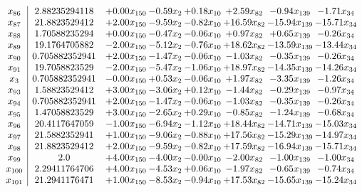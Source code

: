 \documentclass[8pt]{article}
\begin{document}
\[\begin{array}{c| c c@{\hskip 2pt} c@{\hskip 2pt} c@{\hskip 2pt} c@{\hskip 2pt} c@{\hskip 2pt} c@{\hskip 2pt} }
 x_{86}   &  2.88235294118 & +  0.00 x_{150} & -0.59 x_{2} & +  0.18 x_{10} & +  2.59 x_{82} & -0.94 x_{139} & -1.71 x_{34}\\
 x_{87}   &  21.8823529412 & +  2.00 x_{150} & -9.59 x_{2} & -0.82 x_{10} & + 16.59 x_{82} & -15.94 x_{139} & -15.71 x_{34}\\
 x_{88}   &  1.70588235294 & +  0.00 x_{150} & -0.47 x_{2} & -0.06 x_{10} & +  0.97 x_{82} & +  0.65 x_{139} & -0.26 x_{34}\\
 x_{89}   &  19.1764705882 & -2.00 x_{150} & -5.12 x_{2} & -0.76 x_{10} & + 18.62 x_{82} & -13.59 x_{139} & -13.44 x_{34}\\
 x_{90}   &  0.705882352941 & +  2.00 x_{150} & -1.47 x_{2} & -0.06 x_{10} & -1.03 x_{82} & -0.35 x_{139} & -0.26 x_{34}\\
 x_{91}   &  19.7058823529 & -2.00 x_{150} & -5.47 x_{2} & -1.06 x_{10} & + 18.97 x_{82} & -14.35 x_{139} & -14.26 x_{34}\\
 x_{3}   &  0.705882352941 & -0.00 x_{150} & +  0.53 x_{2} & -0.06 x_{10} & +  1.97 x_{82} & -3.35 x_{139} & -1.26 x_{34}\\
 x_{93}   &  1.58823529412 & +  3.00 x_{150} & -3.06 x_{2} & +  0.12 x_{10} & -1.44 x_{82} & -0.29 x_{139} & -0.97 x_{34}\\
 x_{94}   &  0.705882352941 & +  2.00 x_{150} & -1.47 x_{2} & -0.06 x_{10} & -1.03 x_{82} & -0.35 x_{139} & -0.26 x_{34}\\
 x_{95}   &  1.47058823529 & +  3.00 x_{150} & -2.65 x_{2} & +  0.29 x_{10} & -0.85 x_{82} & -1.24 x_{139} & -0.68 x_{34}\\
 x_{96}   &  20.4117647059 & -1.00 x_{150} & -6.94 x_{2} & -1.12 x_{10} & + 18.44 x_{82} & -14.71 x_{139} & -15.03 x_{34}\\
 x_{97}   &  21.5882352941 & +  1.00 x_{150} & -9.06 x_{2} & -0.88 x_{10} & + 17.56 x_{82} & -15.29 x_{139} & -14.97 x_{34}\\
 x_{98}   &  21.8823529412 & +  2.00 x_{150} & -9.59 x_{2} & -0.82 x_{10} & + 17.59 x_{82} & -16.94 x_{139} & -15.71 x_{34}\\
 x_{99}   &  2.0 & +  4.00 x_{150} & -4.00 x_{2} & -0.00 x_{10} & -2.00 x_{82} & -1.00 x_{139} & -1.00 x_{34}\\
 x_{100}   &  2.29411764706 & +  4.00 x_{150} & -4.53 x_{2} & +  0.06 x_{10} & -1.97 x_{82} & -0.65 x_{139} & -0.74 x_{34}\\
 x_{101}   &  21.2941176471 & +  1.00 x_{150} & -8.53 x_{2} & -0.94 x_{10} & + 17.53 x_{82} & -15.65 x_{139} & -15.24 x_{34}\\

\end{array}\]
\end{document}
